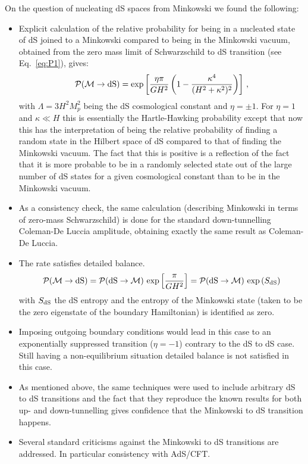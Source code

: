 \documentclass[11pt,a4paper]{article}
\newcommand{\be}{\begin{equation}}
\newcommand{\ee}{\end{equation}}
\begin{document}
On the question of nucleating dS spaces from Minkowski we found the following:
 \begin{itemize}
 \item{} Explicit calculation of the relative probability for being in a nucleated state of dS joined to a Minkowski compared to being in the Minkowski vacuum, obtained from the zero mass limit of Schwarzschild to dS transition (see Eq.~\eqref{eq:P1}), gives:
 \be
 \mathcal{P}(\mathcal{M}\rightarrow {\rm{dS}}) = \exp\left[\frac{\eta\pi}{G H^2} \left(1 - \frac{\kappa^{4}}{(H^{2}+\kappa^{2})^{2}}\right)\right] \,,
 \label{MdSrate}\ee
 with $\Lambda = 3 H^2 M_p^2$ being the dS cosmological constant and $\eta=\pm 1$. For $\eta=1$ and  $\kappa \ll H$ this is essentially the Hartle-Hawking probability except that now this has the interpretation of being the relative probability of finding a random state in the Hilbert space of dS compared to that of finding the Minkowski vacuum. The fact that this is positive is a reflection of the fact that it is more probable to be in a randomly selected state out of the large number of dS states for a given cosmological constant than to be in the Minkowski vacuum.
 \item{} As a consistency check, the same calculation (describing Minkowski in terms of zero-mass Schwarzschild) is done for the standard down-tunnelling Coleman-De Luccia amplitude, obtaining exactly the same result as Coleman-De Luccia.
  \item{} The rate satisfies detailed balance.
  \be
 \mathcal{P}(\mathcal{M}\rightarrow {\rm{dS}}) =  \mathcal{P}({{\rm{dS}}\rightarrow \mathcal{M}})\, \exp \left[\frac{\pi}{GH^{2}}\right] =\mathcal{P}({{\rm{dS}}\rightarrow \mathcal{M}})\, \exp\left(S_{\rm dS}\right)
  \ee
  with $S_{\rm dS}$ the dS entropy and the entropy of the Minkowski state (taken to be the zero eigenstate of the boundary Hamiltonian) is identified as zero.
  \item{} Imposing outgoing boundary conditions would lead in this case to an exponentially suppressed transition ($\eta=-1$) contrary to the dS to dS case. Still having a non-equilibrium situation detailed balance is not satisfied in this case.
 \item{} As mentioned above, the same techniques were used to include arbitrary dS to dS transitions and the fact that they reproduce the  known results for both up- and down-tunnelling gives confidence that the Minkowski to dS transition happens.
 \item{} Several standard criticisms against the Minkowski to dS transitions are addressed. In particular consistency with AdS/CFT.
 \end{itemize}
\end{document}
